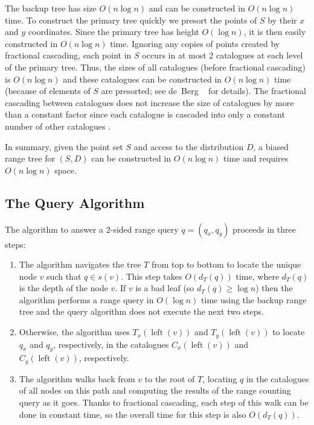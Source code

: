 \documentclass[lotsofwhite,charterfonts]{patmorin}
\DeclareMathOperator{\lft}{left}
\begin{document}
The backup tree has size $O(n\log n)$ and can be constructed in
$O(n\log n)$ time.  To construct the primary tree quickly we presort
the points of $S$ by their $x$ and $y$ coordinates.  Since the
primary tree has height $O(\log n)$, it is then easily constructed in
$O(n\log n)$ time. 
Ignoring any copies of points created by fractional cascading,
each point in $S$ occurs in at most 2 catalogues at each
level of the primary tree.  Thus, the sizes of all catalogues (before
fractional cascading) is $O(n\log n)$ and these catalogues can be
constructed in $O(n\log n)$ time (because of elements of $S$ are
presorted; see de~Berg \etal\ \cite{bkos97} for details).  The
fractional cascading between catalogues does not increase the size of
catalogues by more than a constant factor since each catalogue is
cascaded into only a constant number of other catalogues \cite{ae76}.

In summary, given the point set $S$ and access to the distribution
$D$, a biased range tree for $(S,D)$ can be constructed in $O(n\log
n)$ time and requires $O(n\log n)$ space.


\subsection{The Query Algorithm}

The algorithm to answer a 2-sided range query $q=(q_x,q_y)$ proceeds
in three steps:

\begin{enumerate}

\item The algorithm navigates the tree $T$ from top to bottom to
locate the unique node $v$ such that $q\in s(v)$. This step takes
$O(d_T(q))$ time, where $d_T(q)$ is the depth of the node $v$.  If $v$
is a bad leaf (so $d_T(q)\ge \log n$) then the algorithm performs a
range query in $O(\log n)$ time using the backup range tree and the
query algorithm does not execute the next two steps.

\item  Otherwise, the algorithm uses $T_x(\lft(v))$ and
$T_y(\lft(v))$ to locate $q_x$ and $q_y$, respectively, in the catalogues
$C_x(\lft(v))$ and $C_y(\lft(v))$, respectively.

\item The algorithm walks back from $v$ to the root of $T$, locating
$q$ in the catalogues of all nodes on this path and computing the
results of the range counting query as it goes.  Thanks to fractional
cascading, each step of this walk can be done in constant time, so the
overall time for this step is also $O(d_T(q))$.
\end{enumerate}
\end{document}
